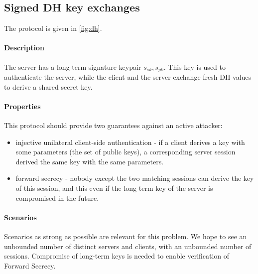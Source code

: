 \documentclass{article}
\newcommand{\sfsk}{\mathit{sk}}
\newcommand{\sfpk}{\mathit{pk}}
\begin{document}
\subsection{Signed DH key exchanges}\label{prob:dh}

The protocol is given in \cref{fig:dh}.

 \paragraph{Description} The server has a long term signature keypair $s_\sfsk,s_\sfpk$.
This key is used to authenticate the server, while the client and the server exchange fresh DH values to derive a shared secret key.

\paragraph{Properties} This protocol should provide two guarantees against an active attacker:
\begin{itemize}
\item injective unilateral client-side authentication - if a client derives a key with some parameters (the set of public keys), a corresponding server session derived the same key with the same parameters.
\item forward secrecy - nobody except the two matching sessions can derive the key of this session, and this even if the long term key of the server is compromised in the future.
\end{itemize}

\paragraph{Scenarios} Scenarios as strong as possible are relevant for this problem. We hope to see an unbounded number of distinct servers and clients, with an unbounded number of sessions. Compromise of long-term keys is needed to enable verification of Forward Secrecy.  
\end{document}
